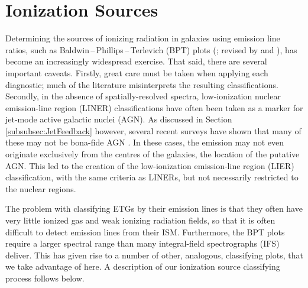 \section{Ionization Sources}
	\label{sec:Diagnostics}
	Determining the sources of ionizing radiation in galaxies using emission line ratios, such as Baldwin\,--\,Phillips\,--\,Terlevich (BPT) plots (\citealt{Baldwin1981}; revised by \citealt{Kewley2001, Kewley2006} and \citealt{Kauffmann2003a}), has become an increasingly widespread exercise. That said, there are several important caveats. Firstly, great care must be taken when applying each diagnostic; much of the literature misinterprets the resulting classifications. Secondly, in the absence of spatially-resolved spectra, low-ionization nuclear emission-line region (LINER) classifications have often been taken as a marker for jet-mode active galactic nuclei (AGN). As discussed in Section \ref{subsubsec:JetFeedback} however, several recent surveys have shown that many of these may not be bona-fide AGN \citep[e.g.][]{Sarzi2005, Sarzi2010, Singh2013, Belfiore2016a}. In these cases, the emission may not even originate exclusively from the centres of the galaxies, the location of the putative AGN. This led to the creation of the low-ionization emission-line region (LIER) classification, with the same criteria as LINERs, but not necessarily restricted to the nuclear regions.

	The problem with classifying ETGs by their emission lines is that they often have very little ionized gas and weak ionizing radiation fields, so that it is often difficult to detect emission lines from their ISM. Furthermore, the BPT plots require a larger spectral range than many integral-field spectrographs (IFS) deliver. This has given rise to a number of other, analogous, classifying plots, that we take advantage of here. A description of our ionization source classifying process follows below. 


